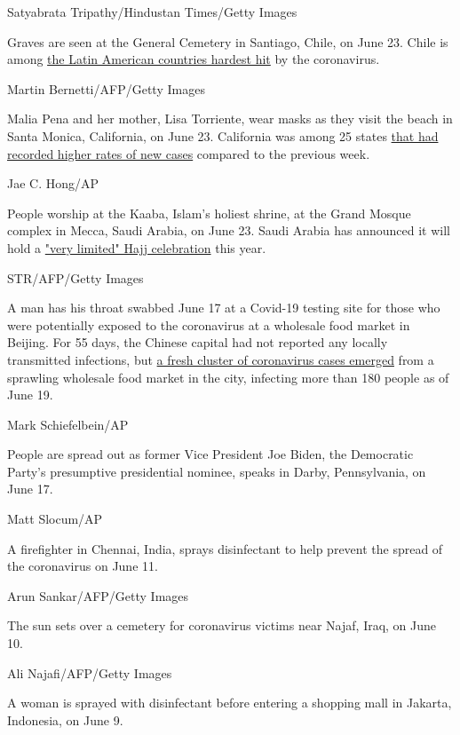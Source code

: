 Satyabrata Tripathy/Hindustan Times/Getty Images

Graves are seen at the General Cemetery in Santiago, Chile, on June 23.
Chile is among
\href{https://www.cnn.com/2020/05/26/americas/latin-america-coronavirus-toll-intl/index.html}{the
Latin American countries hardest hit} by the coronavirus.

Martin Bernetti/AFP/Getty Images

Malia Pena and her mother, Lisa Torriente, wear masks as they visit the
beach in Santa Monica, California, on June 23. California was among 25
states
\href{https://www.cnn.com/2020/06/23/us/us-coronavirus-tuesday/index.html}{that
had recorded higher rates of new cases} compared to the previous week.

Jae C. Hong/AP

People worship at the Kaaba, Islam's holiest shrine, at the Grand Mosque
complex in Mecca, Saudi Arabia, on June 23. Saudi Arabia has announced
it will hold a
\href{https://www.cnn.com/2020/06/22/middleeast/hajj-pilgrimage-saudi-arabia-coronavirus-intl/index.html}{"very
limited" Hajj celebration} this year.

STR/AFP/Getty Images

A man has his throat swabbed June 17 at a Covid-19 testing site for
those who were potentially exposed to the coronavirus at a wholesale
food market in Beijing. For 55 days, the Chinese capital had not
reported any locally transmitted infections, but
\href{https://www.cnn.com/2020/06/18/asia/beijing-coronavirus-reminder-intl-hnk/index.html}{a
fresh cluster of coronavirus cases emerged} from a sprawling wholesale
food market in the city, infecting more than 180 people as of June 19.

Mark Schiefelbein/AP

People are spread out as former Vice President Joe Biden, the Democratic
Party's presumptive presidential nominee, speaks in Darby, Pennsylvania,
on June 17.

Matt Slocum/AP

A firefighter in Chennai, India, sprays disinfectant to help prevent the
spread of the coronavirus on June 11.

Arun Sankar/AFP/Getty Images

The sun sets over a cemetery for coronavirus victims near Najaf, Iraq,
on June 10.

Ali Najafi/AFP/Getty Images

A woman is sprayed with disinfectant before entering a shopping mall in
Jakarta, Indonesia, on June 9.

